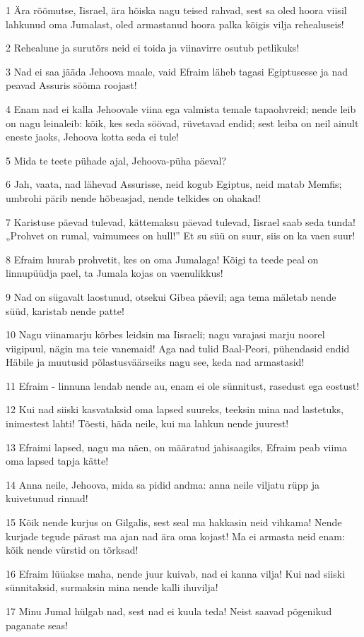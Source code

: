 \par 1 Ära rõõmutse, Iisrael, ära hõiska nagu teised rahvad, sest sa oled hoora viisil lahkunud oma Jumalast, oled armastanud hoora palka kõigis vilja rehealuseis!
\par 2 Rehealune ja surutõrs neid ei toida ja viinavirre osutub petlikuks!
\par 3 Nad ei saa jääda Jehoova maale, vaid Efraim läheb tagasi Egiptusesse ja nad peavad Assuris sööma roojast!
\par 4 Enam nad ei kalla Jehoovale viina ega valmista temale tapaohvreid; nende leib on nagu leinaleib: kõik, kes seda söövad, rüvetavad endid; sest leiba on neil ainult eneste jaoks, Jehoova kotta seda ei tule!
\par 5 Mida te teete pühade ajal, Jehoova-püha päeval?
\par 6 Jah, vaata, nad lähevad Assurisse, neid kogub Egiptus, neid matab Memfis; umbrohi pärib nende hõbeasjad, nende telkides on ohakad!
\par 7 Karistuse päevad tulevad, kättemaksu päevad tulevad, Iisrael saab seda tunda! „Prohvet on rumal, vaimumees on hull!” Et su süü on suur, siis on ka vaen suur!
\par 8 Efraim luurab prohvetit, kes on oma Jumalaga! Kõigi ta teede peal on linnupüüdja pael, ta Jumala kojas on vaenulikkus!
\par 9 Nad on sügavalt laostunud, otsekui Gibea päevil; aga tema mäletab nende süüd, karistab nende patte!
\par 10 Nagu viinamarju kõrbes leidsin ma Iisraeli; nagu varajasi marju noorel viigipuul, nägin ma teie vanemaid! Aga nad tulid Baal-Peori, pühendasid endid Häbile ja muutusid põlastusväärseiks nagu see, keda nad armastasid!
\par 11 Efraim - linnuna lendab nende au, enam ei ole sünnitust, rasedust ega eostust!
\par 12 Kui nad siiski kasvataksid oma lapsed suureks, teeksin mina nad lastetuks, inimestest lahti! Tõesti, häda neile, kui ma lahkun nende juurest!
\par 13 Efraimi lapsed, nagu ma näen, on määratud jahisaagiks, Efraim peab viima oma lapsed tapja kätte!
\par 14 Anna neile, Jehoova, mida sa pidid andma: anna neile viljatu rüpp ja kuivetunud rinnad!
\par 15 Kõik nende kurjus on Gilgalis, sest seal ma hakkasin neid vihkama! Nende kurjade tegude pärast ma ajan nad ära oma kojast! Ma ei armasta neid enam: kõik nende vürstid on tõrksad!
\par 16 Efraim lüüakse maha, nende juur kuivab, nad ei kanna vilja! Kui nad siiski sünnitaksid, surmaksin mina nende kalli ihuvilja!
\par 17 Minu Jumal hülgab nad, sest nad ei kuula teda! Neist saavad põgenikud paganate seas!

